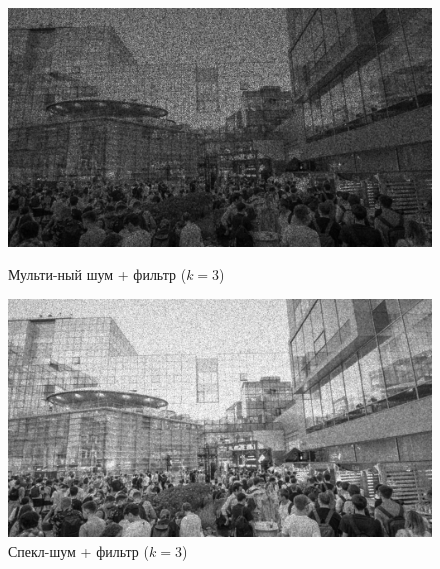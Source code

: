 \documentclass[a4paper]{article}
\begin{document}
\begin{figure}[H]
    \begin{minipage}{0.49\textwidth}
        \centering \includegraphics[width=\textwidth]{images/3_nonlinear_filters/multiplicative - wiener (k=3).jpg}
        \caption{Мульти-ный шум + фильтр ($k = 3$)}
    \end{minipage}\hfill
    \begin{minipage}{0.49\textwidth}
        \centering \includegraphics[width=\textwidth]{images/3_nonlinear_filters/speckle - wiener (k=3).jpg}
        \caption{Спекл-шум + фильтр ($k = 3$)}
    \end{minipage}
\end{figure}
\end{document}
